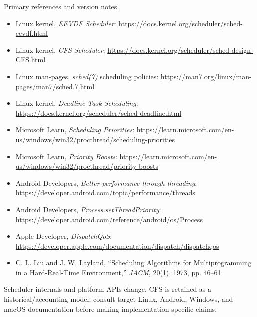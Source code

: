 \documentclass[aspectratio=169,11pt]{beamer}
\begin{document}
\begin{frame}{Primary references and version notes}
  \scriptsize
  \begin{itemize}
    \item Linux kernel, \emph{EEVDF Scheduler}: \url{https://docs.kernel.org/scheduler/sched-eevdf.html}
    \item Linux kernel, \emph{CFS Scheduler}: \url{https://docs.kernel.org/scheduler/sched-design-CFS.html}
    \item Linux man-pages, \emph{sched(7)} scheduling policies: \url{https://man7.org/linux/man-pages/man7/sched.7.html}
    \item Linux kernel, \emph{Deadline Task Scheduling}: \url{https://docs.kernel.org/scheduler/sched-deadline.html}
    \item Microsoft Learn, \emph{Scheduling Priorities}: \url{https://learn.microsoft.com/en-us/windows/win32/procthread/scheduling-priorities}
    \item Microsoft Learn, \emph{Priority Boosts}: \url{https://learn.microsoft.com/en-us/windows/win32/procthread/priority-boosts}
    \item Android Developers, \emph{Better performance through threading}: \url{https://developer.android.com/topic/performance/threads}
    \item Android Developers, \emph{Process.setThreadPriority}: \url{https://developer.android.com/reference/android/os/Process}
    \item Apple Developer, \emph{DispatchQoS}: \url{https://developer.apple.com/documentation/dispatch/dispatchqos}
    \item C. L. Liu and J. W. Layland, “Scheduling Algorithms for Multiprogramming in a Hard-Real-Time Environment,” \emph{JACM}, 20(1), 1973, pp. 46--61.
  \end{itemize}
  \begin{tcolorbox}[title=Version discipline,colback=blue!5,colframe=blue!65]
    Scheduler internals and platform APIs change. CFS is retained as a historical/accounting model; consult target Linux, Android, Windows, and macOS documentation before making implementation-specific claims.
  \end{tcolorbox}
\end{frame}
\end{document}
